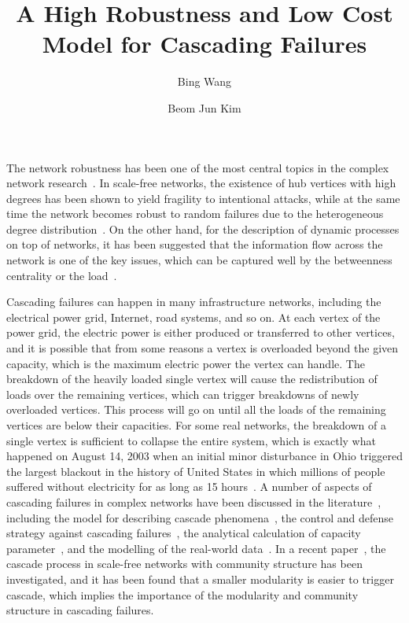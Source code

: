 \documentclass[doublecol]{epl2}
\title{A High Robustness and Low Cost Model for Cascading Failures}
\author{Bing Wang \and Beom Jun Kim}
\institute{ Department of Physics, BK21 Physics Research
Division, and Institute of Basic Science, Sungkyunkwan University,
Suwon 440-746, Korea}
\begin{document}
\maketitle


The network robustness has been one of the most central topics in
the complex network research~\cite{Internet}. In scale-free
networks, the existence of hub vertices with high degrees has been
shown to yield fragility to intentional attacks, while at the same
time the network becomes robust to random failures due to the
heterogeneous degree distribution~\cite{Albert,Cohen1,Holme,Bing}.
On the other hand, for the description of dynamic processes on top
of networks, it has been suggested that the information flow across
the network is one of the key issues, which can be captured well by
the betweenness centrality or the load~\cite{Loaddis}.


Cascading failures can happen in many infrastructure networks,
including the electrical power grid, Internet, road systems, and so
on. At each vertex of the power grid, the electric power is either
produced or transferred to other vertices, and it is possible that
from some reasons a vertex is overloaded beyond the given capacity,
which is the maximum electric power the vertex can handle. The
breakdown of the heavily loaded single vertex will cause the
redistribution of loads over the remaining vertices, which can
trigger breakdowns of newly overloaded vertices. This process will
go on until all the loads of the remaining vertices are below their
capacities. For some real networks, the breakdown of a single vertex
is sufficient to collapse the entire system, which is exactly what
happened on August 14, 2003 when an initial minor disturbance in
Ohio triggered the largest blackout in the history of United States
in which millions of people suffered without electricity for as long
as 15 hours~\cite{Report}. A number of aspects of cascading failures
in complex networks have been discussed in the
literature~\cite{CasModel,Control1,Control2,alfa,Realdata,Effic1,Vexload,LoadCost,Wu},
including the model for describing cascade
phenomena~\cite{CasModel}, the control and defense strategy against
cascading failures~\cite{Control1,Control2}, the analytical
calculation of capacity parameter~\cite{alfa}, and the modelling of
the real-world data~\cite{Realdata}.
In a recent paper~\cite{Wu}, the
cascade process in scale-free networks 
with community structure has been investigated,
and it has been found that a smaller modularity is
easier to trigger cascade, which implies the importance
of the modularity and community structure in cascading
failures. 
\end{document}
